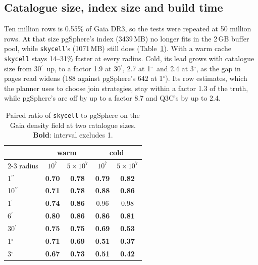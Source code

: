 \documentclass[final,5p,times,twocolumn,authoryear]{elsarticle}
\newcommand{\arcsec}{\ensuremath{^{\prime\prime}}}
\newcommand{\arcmin}{\ensuremath{^{\prime}}}
\newcommand{\degr}{\ensuremath{^{\circ}}}
\begin{document}
\subsection{Catalogue size, index size and build time}
\label{sec:scale}
\label{sec:scale-memory}

Ten million rows is 0.55\% of Gaia DR3, so the tests were repeated at 50 million rows.
At that size pgSphere's index (3439\,MB) no longer fits in the 2\,GB buffer pool, while
\texttt{skycell}'s (1071\,MB) still does (Table~\ref{tab:scale}). With a warm cache
\texttt{skycell} stays 14--31\% faster at every radius. Cold, its lead grows with
catalogue size from 30\arcmin\ up, to a factor 1.9 at 30\arcmin, 2.7 at 1\degr\ and 2.4
at 3\degr, as the gap in pages read widens (188 against pgSphere's 642 at 1\degr). Its
row estimates, which the planner uses to choose join strategies, stay within a factor
1.3 of the truth, while pgSphere's are off by up to a factor 8.7 and Q3C's by up to 2.4.

\begin{table}
  \caption{Paired ratio of \texttt{skycell} to pgSphere on the Gaia density field at two
    catalogue sizes. \textbf{Bold}: interval excludes 1.}
  \label{tab:scale}
  \centering
  \footnotesize
  \begin{tabular}{@{}l cc cc@{}}
    \hline\hline
    & \multicolumn{2}{c}{warm} & \multicolumn{2}{c}{cold} \\
    \cline{2-3}\cline{4-5}
    radius & $10^7$ & $5{\times}10^7$ & $10^7$ & $5{\times}10^7$ \\
    \hline
    1\arcsec  & \textbf{0.70} & \textbf{0.78} & \textbf{0.79} & \textbf{0.82} \\
    10\arcsec & \textbf{0.71} & \textbf{0.78} & \textbf{0.88} & \textbf{0.86} \\
    1\arcmin  & \textbf{0.74} & \textbf{0.86} & 0.96          & 0.98          \\
    6\arcmin  & \textbf{0.80} & \textbf{0.86} & \textbf{0.86} & \textbf{0.81} \\
    30\arcmin & \textbf{0.75} & \textbf{0.75} & \textbf{0.69} & \textbf{0.53} \\
    1\degr    & \textbf{0.71} & \textbf{0.69} & \textbf{0.51} & \textbf{0.37} \\
    3\degr    & \textbf{0.67} & \textbf{0.73} & \textbf{0.51} & \textbf{0.42} \\
    \hline
  \end{tabular}
\end{table}
\end{document}
